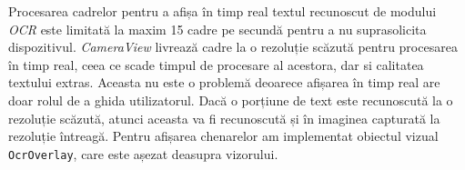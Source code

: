 Procesarea cadrelor pentru a afișa în timp real textul recunoscut de modului \emph{OCR} este limitată la maxim 15 cadre pe secundă pentru a nu suprasolicita dispozitivul. \emph{CameraView} livrează cadre la o rezoluție scăzută pentru procesarea în timp real, ceea ce scade timpul de procesare al acestora, dar si calitatea textului extras. Aceasta nu este o problemă deoarece afișarea în timp real are doar rolul de a ghida utilizatorul. Dacă o porțiune de text este recunoscută la o rezoluție scăzută, atunci aceasta va fi recunoscută și în imaginea capturată la rezoluție întreagă. Pentru afișarea chenarelor am implementat obiectul vizual \texttt{OcrOverlay}, care este așezat deasupra vizorului.


